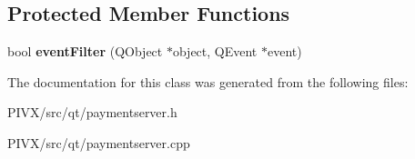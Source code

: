 \subsection*{Protected Member Functions}
\begin{DoxyCompactItemize}
\item 
\mbox{\label{class_payment_server_af795e3c318556c833792e530b279efc9}} 
bool {\bfseries event\+Filter} (Q\+Object $\ast$object, Q\+Event $\ast$event)
\end{DoxyCompactItemize}


The documentation for this class was generated from the following files\+:\begin{DoxyCompactItemize}
\item 
P\+I\+V\+X/src/qt/paymentserver.\+h\item 
P\+I\+V\+X/src/qt/paymentserver.\+cpp\end{DoxyCompactItemize}
